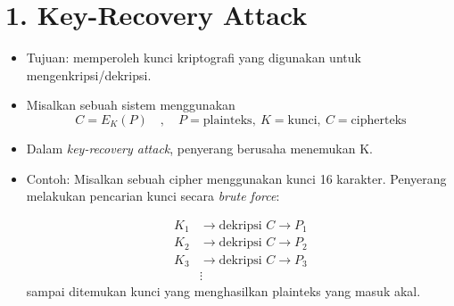 \documentclass{article}
\begin{document}

\section*{1. Key-Recovery Attack}

\begin{itemize}
    \item Tujuan: memperoleh kunci kriptografi yang digunakan untuk mengenkripsi/dekripsi.
    \item Misalkan sebuah sistem menggunakan
    \[ C = E_K(P) \quad , \quad P = \text{plainteks}, \ K = \text{kunci}, \ C = \text{cipherteks} \]
    \item Dalam \textit{key-recovery attack}, penyerang berusaha menemukan K.
    \item Contoh: Misalkan sebuah cipher menggunakan kunci 16 karakter. Penyerang melakukan pencarian kunci secara \textit{brute force}:
    
    \begin{align*}
    K_1 & \to \text{dekripsi } C \to P_1 \\
    K_2 & \to \text{dekripsi } C \to P_2 \\
    K_3 & \to \text{dekripsi } C \to P_3 \\
    & \vdots
    \end{align*}
    sampai ditemukan kunci yang menghasilkan plainteks yang masuk akal.
\end{itemize}
\end{document}
